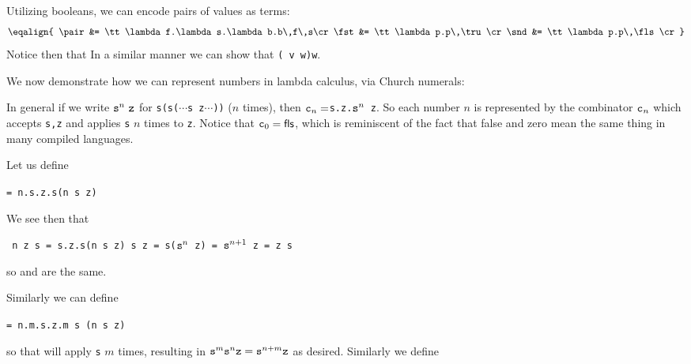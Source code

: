 Utilizing booleans, we can encode pairs of values as terms:
$$ \eqalign{
    \pair &= \tt\lambda f.\lambda s.\lambda b.b\,f\,s\cr
    \fst &= \tt\lambda p.p\,\tru\cr
    \snd &= \tt\lambda p.p\,\fls\cr
} $$
Notice then that
In a similar manner we can show that {\tt \snd(\pair\ v w)\to w}.

We now demonstrate how we can represent numbers in lambda calculus, via Church numerals:

\medskip
\centerline{\vbox{}}
\medskip

In general if we write ${\tt s}^n\ \tt z$ for {\tt s(s($\cdots$s z$\cdots$))} ($n$ times), then $\cn n=${\tt\lambda s.\lambda z.${\tt s}^n$ z}.
So each number $n$ is represented by the combinator $\cn n$ which accepts {\tt s,z} and applies {\tt s} $n$ times to {\tt z}.
Notice that $\cn0=\fls$, which is reminiscent of the fact that false and zero mean the same thing in many compiled languages.

Let us define

\centerline{\tt \scc = \lambda n.\lambda s.\lambda z.s(n s z)}

We see then that

\centerline{\tt\scc\ \cn n z s = \lambda s.\lambda z.s(\cn n s z) s z = s(${\tt s}^n$ z) = ${\tt s}^{n+1}$ z =  z s}
so  and  are the same.

Similarly we can define

\centerline{\tt \plus = \lambda n.\lambda m.\lambda s.\lambda z.m s (n s z)}

so that  will apply {\tt s}  $m$ times, resulting in ${\tt s}^m{\tt s}^n{\tt z}={\tt s}^{n+m}{\tt z}$ as desired.
Similarly we define

